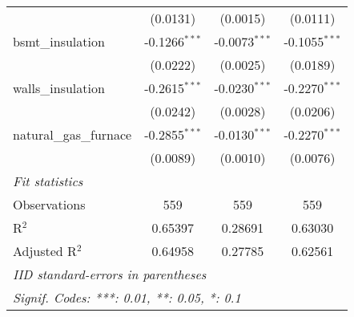 \begin{tabular}{lccc}
                           & (0.0131)                                                                 & (0.0015)                                                                    & (0.0111)\\
   bsmt\_insulation       & -0.1266$^{***}$                                                          & -0.0073$^{***}$                                                             & -0.1055$^{***}$\\
                           & (0.0222)                                                                 & (0.0025)                                                                    & (0.0189)\\
   walls\_insulation      & -0.2615$^{***}$                                                          & -0.0230$^{***}$                                                             & -0.2270$^{***}$\\
                           & (0.0242)                                                                 & (0.0028)                                                                    & (0.0206)\\
   natural\_gas\_furnace & -0.2855$^{***}$                                                          & -0.0130$^{***}$                                                             & -0.2270$^{***}$\\
                           & (0.0089)                                                                 & (0.0010)                                                                    & (0.0076)\\
   \midrule \emph{Fit statistics} &   &   &  \\
   Observations            & 559                                                                      & 559                                                                         & 559\\
   R$^2$                   & 0.65397                                                                  & 0.28691                                                                     & 0.63030\\
   Adjusted R$^2$          & 0.64958                                                                  & 0.27785                                                                     & 0.62561\\
   \midrule\midrule\multicolumn{4}{l}{\emph{IID standard-errors in parentheses}}\\
   \multicolumn{4}{l}{\emph{Signif. Codes: ***: 0.01, **: 0.05, *: 0.1}}\\
\end{tabular}




